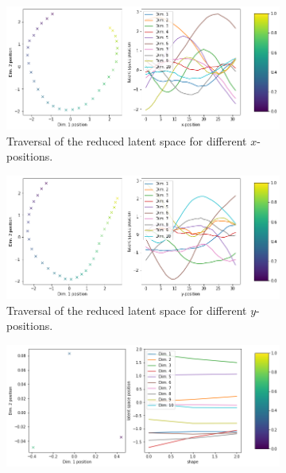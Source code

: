 \begin{figure}[H]
    \centering
    \begin{subfigure}{.48\textwidth}
        \includegraphics[width=\textwidth]{images/latent_space_traversals/vae_3750_dsprites_latent_space_values_x_position.png}
        \caption{Traversal of the reduced latent space for different $x$-positions.}
    \end{subfigure}
    \begin{subfigure}{.48\textwidth}
        \includegraphics[width=\textwidth]{images/latent_space_traversals/vae_3750_dsprites_latent_space_values_y_position.png}
        \caption{Traversal of the reduced latent space for different $y$-positions.}
    \end{subfigure}
    \begin{subfigure}{.48\textwidth}
        \includegraphics[width=\textwidth]{images/latent_space_traversals/vae_3750_dsprites_latent_space_values_shape.png}

\end{subfigure}
\end{figure}
